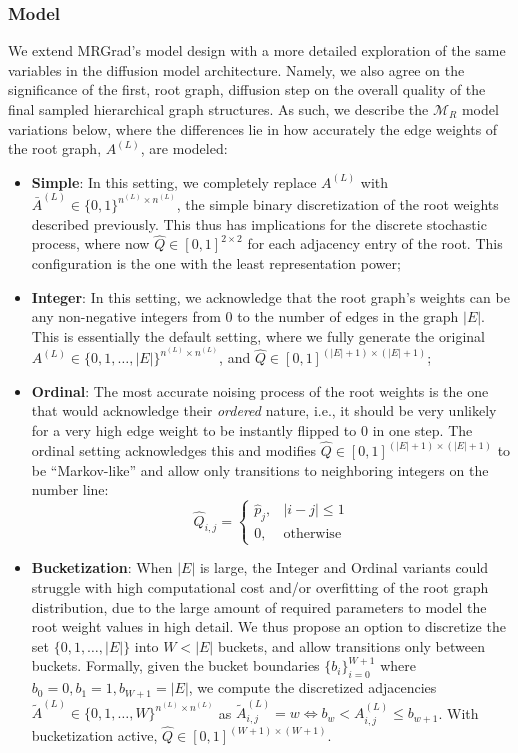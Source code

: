 \subsubsection{Model}
We extend MRGrad's model design with a more detailed exploration of the same variables in the diffusion model architecture. Namely, we also agree on the significance of the first, root graph, diffusion step on the overall quality of the final sampled hierarchical graph structures. As such, we describe the $\mathcal{M}_R$ model variations below, where the differences lie in how accurately the edge weights of the root graph, $A^{(L)}$, are modeled:
\begin{itemize}
    \item \textbf{Simple}: In this setting, we completely replace $A^{(L)}$ with $\bar{A}^{(L)} \in \{0,1\}^{n^{(L)} \times n^{(L)}}$, the simple binary discretization of the root weights described previously. This thus has implications for the discrete stochastic process, where now $\hat{Q}\in[0,1]^{2 \times 2}$ for each adjacency entry of the root. This configuration is the one with the least representation power;
    \item \textbf{Integer}: In this setting, we acknowledge that the root graph's weights can be any non-negative integers from 0 to the number of edges in the graph $|E|$. This is essentially the default setting, where we fully generate the original $A^{(L)} \in \{0,1,\dots,|E|\}^{n^{(L)} \times n^{(L)}}$, and $\hat{Q}\in[0,1]^{(|E|+1) \times (|E|+1)}$;
    \item \textbf{Ordinal}: The most accurate noising process of the root weights is the one that would acknowledge their \emph{ordered} nature, i.e., it should be very unlikely for a very high edge weight to be instantly flipped to 0 in one step. The ordinal setting acknowledges this and modifies $\hat{Q} \in [0,1]^{(|E|+1) \times (|E|+1)}$ to be \enquote{Markov-like} and allow only transitions to neighboring integers on the number line: 
    \begin{equation}
        \hat{Q}_{i,j}=\begin{cases}
            \hat{p}_j, & |i-j|\leq 1 \\
            0, & \text{otherwise}
        \end{cases}
    \end{equation}
    \item \textbf{Bucketization}: When $|E|$ is large, the Integer and Ordinal variants could struggle with high computational cost and/or overfitting of the root graph distribution, due to the large amount of required parameters to model the root weight values in high detail. We thus propose an option to discretize the set $\{0,1,\dots,|E|\}$ into $W<|E|$ buckets, and allow transitions only between buckets. Formally, given the bucket boundaries $\{b_i\}_{i=0}^{W+1}$ where $b_0=0,b_1=1,b_{W+1}=|E|$, we compute the discretized adjacencies $\tilde{A}^{(L)} \in \{0,1,\dots,W\}^{n^{(L)} \times n^{(L)}}$ as $\tilde{A}_{i,j}^{(L)}=w \Leftrightarrow b_w < A_{i,j}^{(L)} \leq  b_{w+1}$. With bucketization active, $\hat{Q} \in [0,1]^{(W+1) \times (W+1)}$.
\end{itemize}


